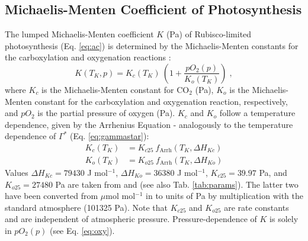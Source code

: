 \documentclass{myreport}
\begin{document}
\subsection{Michaelis-Menten Coefficient of Photosynthesis}
\label{sec:kmm}
The lumped Michaelis-Menten coefficient $K$ (Pa) of Rubisco-limited photosynthesis (Eq. \ref{eq:ac}) is determined by the Michaelis-Menten constants for the carboxylation and oxygenation reactions \citep{farquhar80}:
\begin{equation}
\label{eq:michaelis}
  K(T_K, p) = K_c(T_K)\: \left( 1 + \frac{pO_2(p)}{K_o(T_K)} \right) \;,
\end{equation}
where $K_c$ is the Michaelis-Menten constant for CO$_2$ (Pa), $K_o$ is the Michaelis-Menten constant for the carboxylation and oxygenation reaction, respectively, and $pO_2$ is the partial pressure of oxygen (Pa). $K_c$ and $K_o$ follow a temperature dependence, given by the Arrhenius Equation - analogously to the temperature dependence of $\Gamma^\ast$ (Eq. \ref{eq:gammastar}):
\begin{subequations}
\label{eq:kcko}
\begin{align}
  K_c(T_K)& = K_{c25}\: f_{\text{Arrh}}(T_K, \Delta H_{Kc}) \label{eq:kc} \\
    K_o(T_K)& = K_{o25}\: f_{\text{Arrh}}(T_K, \Delta H_{Ko}) \label{eq:ko}
\end{align}
\end{subequations}
Values $\Delta H_{Kc} = 79430$ J mol$^{-1}$, $\Delta H_{Ko} = 36380$ J mol$^{-1}$, $K_{c25} = 39.97$ Pa, and $K_{o25} = 27480$ Pa are taken from \citet{bernacchi01} and (see also Tab. \ref{tab:params}). The latter two have been converted from $\mu$mol mol$^{-1}$ in \citet{bernacchi01} to units of Pa by multiplication with the standard atmosphere (101325 Pa). Note that $K_{c25}$ and $K_{o25}$ are rate constants and are independent of atmospheric pressure. Pressure-dependence of $K$ is solely in $pO_2(p)$ (see Eq. \ref{eq:oxy}).

\end{document}
